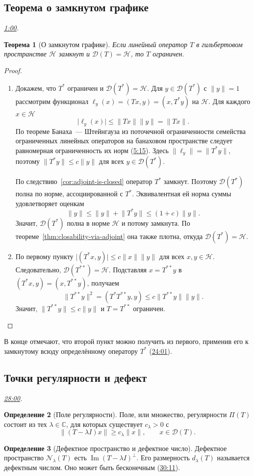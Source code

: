 \documentclass[11pt,a4paper]{article}
\theoremstyle{plain}
\newtheorem{theorem}{Теорема}[section]
\theoremstyle{definition}
\newtheorem{definition}[theorem]{Определение}
\newcommand{\CC}{\mathbb C}
\newcommand{\Hh}{\mathcal H}
\newcommand{\Dom}{\mathcal D}
\newcommand{\id}{I}
\newcommand{\abs}[1]{\lvert#1\rvert}
\newcommand{\norm}[1]{\lVert#1\rVert}
\newcommand{\at}[3]{\href{https://www.youtube.com/watch?v=#1&t=#2s}{#3}}
\newcommand{\topic}[2]{\Needspace{5\baselineskip}\subsection*{#1}\noindent\emph{#2.}\par\nobreak\smallskip}
\begin{document}
\topic{Теорема о замкнутом графике}{\at{dRCTK4VqBTk}{60}{1:00}}
\begin{theorem}[О замкнутом графике]
\label{thm:closed-graph}
Если линейный оператор $T$ в гильбертовом пространстве
$\Hh$ замкнут и $\Dom(T)=\Hh$, то $T$ ограничен.
\end{theorem}
\begin{proof}
\leavevmode
\begin{enumerate}
\item Докажем, что $T^*$ ограничен и $\Dom(T^*)=\Hh$.
Для $y\in\Dom(T^*)$ с $\norm y=1$ рассмотрим функционал
$\ell_y(x)=(Tx,y)=(x,T^*y)$ на $\Hh$. Для каждого $x\in\Hh$
\[
 \abs{\ell_y(x)}\le\norm{Tx}\norm y=\norm{Tx}.
\]
По теореме Банаха~--- Штейнгауза из поточечной ограниченности
семейства ограниченных линейных операторов на банаховом пространстве
следует равномерная ограниченность их норм
(\at{dRCTK4VqBTk}{315}{5:15}). Здесь $\norm{\ell_y}=\norm{T^*y}$,
поэтому $\norm{T^*y}\le c\norm y$ для всех $y\in\Dom(T^*)$.

По следствию~\ref{cor:adjoint-is-closed} оператор $T^*$ замкнут.
Поэтому $\Dom(T^*)$ полна по норме, ассоциированной с $T^*$.
Эквивалентная ей норма суммы удовлетворяет оценкам
\[
 \norm y\le \norm y+\norm{T^*y}\le (1+c)\norm y .
\]
Значит, $\Dom(T^*)$ полна в норме $\Hh$ и потому замкнута.
По теореме~\ref{thm:closability-via-adjoint} она также плотна,
откуда $\Dom(T^*)=\Hh$.

\item По первому пункту $\abs{(T^*x,y)}\le c\norm x\norm y$
для всех $x,y\in\Hh$. Следовательно, $\Dom(T^{**})=\Hh$.
Подставляя $x=T^{**}y$ в $(T^*x,y)=(x,T^{**}y)$, получаем
\[
 \norm{T^{**}y}^2=(T^*T^{**}y,y)\le c\norm{T^{**}y}\norm y .
\]
Значит, $\norm{T^{**}y}\le c\norm y$ и $T=T^{**}$ ограничен.
\end{enumerate}
\end{proof}
В конце отмечают, что второй пункт можно получить из первого,
применив его к замкнутому всюду определённому оператору $T^*$
(\at{dRCTK4VqBTk}{1441}{24:01}).

\topic{Точки регулярности и дефект}{\at{dRCTK4VqBTk}{1680}{28:00}}
\begin{definition}[Поле регулярности]
Поле, или множество, регулярности $\Pi(T)$ состоит из тех $\lambda\in\CC$,
для которых существует $c_\lambda>0$ с
\[
 \norm{(T-\lambda\id)x}\ge c_\lambda\norm x,\qquad
 x\in\Dom(T).
\]
\end{definition}
\begin{definition}[Дефектное пространство и дефектное число]
Дефектное пространство $\mathcal N_\lambda(T)$ есть
$\operatorname{Im}(T-\lambda\id)^\perp$. Его размерность
$d_\lambda(T)$ называется дефектным числом. Оно может быть
бесконечным (\at{dRCTK4VqBTk}{1811}{30:11}).
\end{definition}
\end{document}
